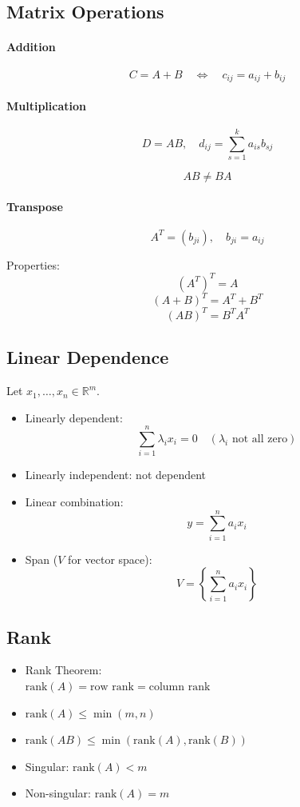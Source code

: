 \subsection{Matrix Operations}

\paragraph{Addition}
\[
C = A + B \quad \Longleftrightarrow \quad c_{ij} = a_{ij} + b_{ij}
\]

\paragraph{Multiplication}
\[
D = AB, \quad d_{ij} = \sum_{s=1}^k a_{is} b_{sj}
\]

\[
AB \neq BA
\]

\paragraph{Transpose}
\[
A^T = (b_{ji}), \quad b_{ji} = a_{ij}
\]

Properties:
\[
(A^T)^T = A
\]
\[
(A+B)^T = A^T + B^T
\]
\[
(AB)^T = B^T A^T
\]

\subsection{Linear Dependence}

Let $x_1, \dots, x_n \in \mathbb{R}^m$.

\begin{itemize}
    \item Linearly dependent:
    \[
    \sum_{i=1}^n \lambda_i x_i = 0 \quad (\lambda_i \text{ not all zero})
    \]
    \item Linearly independent: not dependent
    \item Linear combination:
    \[
    y = \sum_{i=1}^n a_i x_i
    \]
    \item Span ($V$ for vector space):
    \[
    V = \left\{ \sum_{i=1}^n a_i x_i \right\}
    \]
\end{itemize}

\subsection{Rank}

\begin{itemize}
    \item Rank Theorem: \\$\text{rank}(A) = \text{row rank} = \text{column rank}$
    \item $\text{rank}(A) \le \min(m,n)$
    \item $\text{rank}(AB) \le \min(\text{rank}(A), \text{rank}(B))$
    \item Singular: $\text{rank}(A) < m$
    \item Non-singular: $\text{rank}(A) = m$
\end{itemize}


